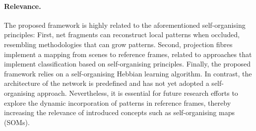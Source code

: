 \paragraph{Relevance.} The proposed framework is highly related to the aforementioned self-organising principles: First, net fragments can reconstruct local patterns when occluded, resembling methodologies that can grow patterns. Second, projection fibres implement a mapping from scenes to reference frames, related to approaches that implement classification based on self-organising principles. Finally, the proposed framework relies on a self-organising Hebbian learning algorithm.
In contrast, the architecture of the network is predefined and has not yet adopted a self-organising approach. Nevertheless, it is essential for future research efforts to explore the dynamic incorporation of patterns in reference frames, thereby increasing the relevance of introduced concepts such as self-organising maps (SOMs).


